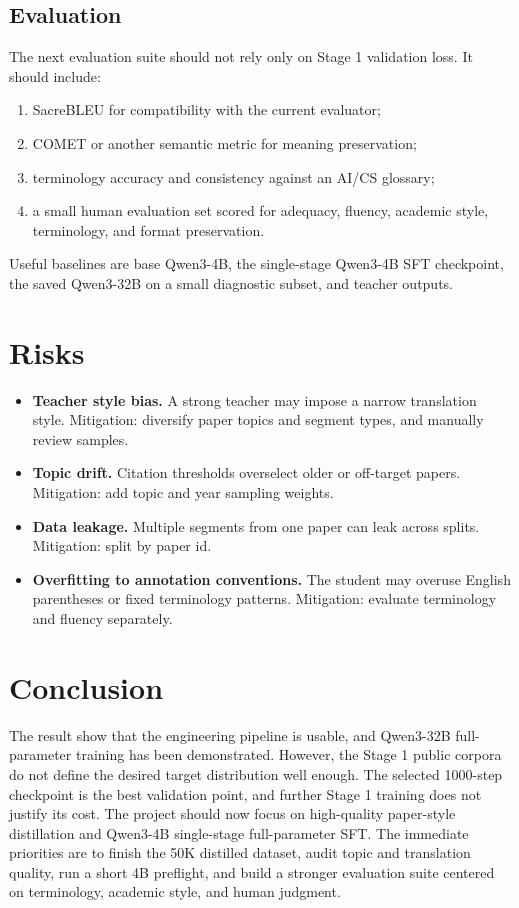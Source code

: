 \documentclass{article}
\begin{document}
\subsection{Evaluation}

The next evaluation suite should not rely only on Stage 1 validation loss. It should include:

\begin{enumerate}
    \item SacreBLEU for compatibility with the current evaluator;
    \item COMET or another semantic metric for meaning preservation;
    \item terminology accuracy and consistency against an AI/CS glossary;
    \item a small human evaluation set scored for adequacy, fluency, academic style, terminology, and format preservation.
\end{enumerate}

Useful baselines are base Qwen3-4B, the single-stage Qwen3-4B SFT checkpoint, the saved Qwen3-32B on a small diagnostic subset, and teacher outputs.

\section{Risks}

\begin{itemize}
    \item \textbf{Teacher style bias.} A strong teacher may impose a narrow translation style. Mitigation: diversify paper topics and segment types, and manually review samples.
    \item \textbf{Topic drift.} Citation thresholds overselect older or off-target papers. Mitigation: add topic and year sampling weights.
    \item \textbf{Data leakage.} Multiple segments from one paper can leak across splits. Mitigation: split by paper id.
    \item \textbf{Overfitting to annotation conventions.} The student may overuse English parentheses or fixed terminology patterns. Mitigation: evaluate terminology and fluency separately.
\end{itemize}

\section{Conclusion}

The  result show that the engineering pipeline is usable, and Qwen3-32B full-parameter training has been demonstrated. However, the Stage 1 public corpora do not define the desired target distribution well enough. The selected 1000-step checkpoint is the best validation point, and further Stage 1 training does not justify its cost. The project should now focus on high-quality paper-style distillation and Qwen3-4B single-stage full-parameter SFT. The immediate priorities are to finish the 50K distilled dataset, audit topic and translation quality, run a short 4B preflight, and build a stronger evaluation suite centered on terminology, academic style, and human judgment.
\end{document}
